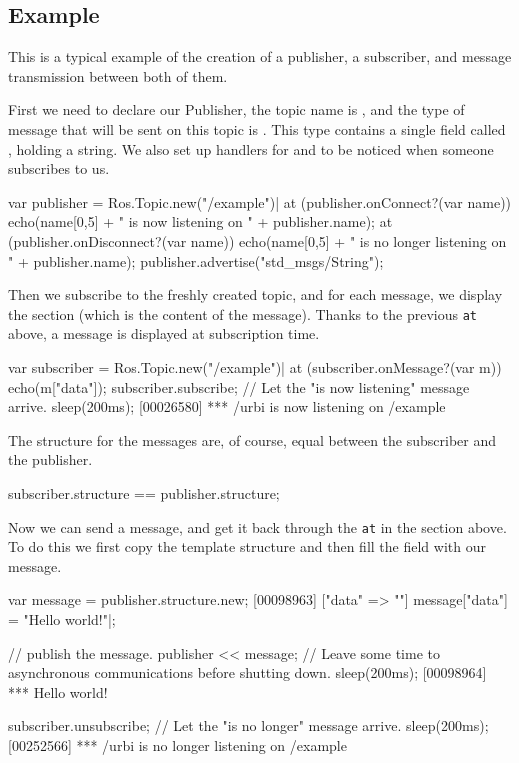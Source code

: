 \subsection{Example}

This is a typical example of the creation of a publisher, a subscriber, and
message transmission between both of them.

First we need to declare our Publisher, the topic name is ,
and the type of message that will be sent on this topic is
. This type contains a single field called
, holding a string.  We also set up handlers for
 and  to be noticed when someone
subscribes to us.

\begin{urbiscript}
var publisher = Ros.Topic.new("/example")|
at (publisher.onConnect?(var name))
  echo(name[0,5] + " is now listening on " + publisher.name);
at (publisher.onDisconnect?(var name))
  echo(name[0,5] + " is no longer listening on " + publisher.name);
publisher.advertise("std_msgs/String");
\end{urbiscript}

Then we subscribe to the freshly created topic, and for each message, we
display the  section (which is the content of the
message). Thanks to the previous \lstinline{at} above, a message is
displayed at subscription time.

\begin{urbiscript}
var subscriber = Ros.Topic.new("/example")|
at (subscriber.onMessage?(var m))
  echo(m["data"]);
subscriber.subscribe;
// Let the "is now listening" message arrive.
sleep(200ms);
[00026580] *** /urbi is now listening on /example
\end{urbiscript}

The structure for the messages are, of course, equal between the subscriber
and the publisher.

\begin{urbiassert}
subscriber.structure == publisher.structure;
\end{urbiassert}

Now we can send a message, and get it back through the \lstinline{at} in the
section above. To do this we first copy the template structure and then fill
the field  with our message.

\begin{urbiscript}
var message = publisher.structure.new;
[00098963] ["data" => ""]
message["data"] = "Hello world!"|;

// publish the message.
publisher << message;
// Leave some time to asynchronous communications before shutting down.
sleep(200ms);
[00098964] *** Hello world!

subscriber.unsubscribe;
// Let the "is no longer" message arrive.
sleep(200ms);
[00252566] *** /urbi is no longer listening on /example
\end{urbiscript}



